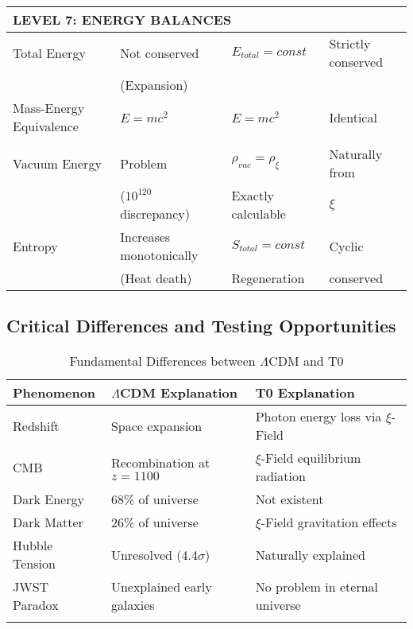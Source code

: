 \documentclass[12pt,a4paper]{article}
\begin{document}
\begin{longtable}{p{4.5cm}p{3.5cm}p{3.5cm}p{3.5cm}}
		\midrule
		\multicolumn{4}{l}{\textbf{LEVEL 7: ENERGY BALANCES}} \\
		\midrule
		
		Total Energy & Not conserved & $E_{total} = const$ & Strictly conserved \\
		& (Expansion) & & \\[0.3em]
		
		Mass-Energy Equivalence & $E = mc^2$ & $E = mc^2$ & Identical \\
		& & & \\[0.3em]
		
		Vacuum Energy & Problem & $\rho_{vac} = \rho_\xi$ & Naturally from \\
		& ($10^{120}$ discrepancy) & Exactly calculable & $\xi$ \\[0.3em]
		
		Entropy & Increases monotonically & $S_{total} = const$ & Cyclic \\
		& (Heat death) & Regeneration & conserved \\[0.3em]
		
	\end{longtable}
	
	\subsection{Critical Differences and Testing Opportunities}
	
	\begin{table}[H]
		\centering
		\begin{tabular}{p{3.5cm}p{5cm}p{5cm}}
			\toprule
			\textbf{Phenomenon} & \textbf{$\Lambda$CDM Explanation} & \textbf{T0 Explanation} \\
			\midrule
			Redshift & Space expansion & Photon energy loss via $\xi$-Field \\
			CMB & Recombination at $z=1100$ & $\xi$-Field equilibrium radiation \\
			Dark Energy & 68\% of universe & Not existent \\
			Dark Matter & 26\% of universe & $\xi$-Field gravitation effects \\
			Hubble Tension & Unresolved (4.4$\sigma$) & Naturally explained \\
			JWST Paradox & Unexplained early galaxies & No problem in eternal universe \\
			\bottomrule

        \caption{Fundamental Differences between $\Lambda$CDM and T0} \\
\end{tabular}
\end{table}
\end{document}

